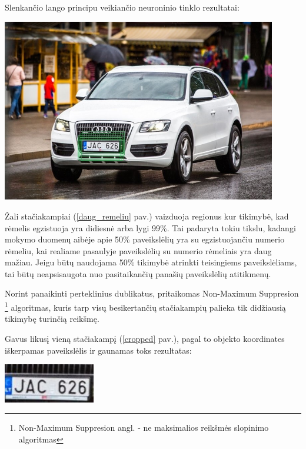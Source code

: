\documentclass{VUMIFInfBakalaurinis}
\begin{document}
Slenkančio lango principu veikiančio neuroninio tinklo rezultatai:

\begin{minipage}{\linewidth}
  \centering
  \includegraphics[width=12cm]{sliding.jpg}
  \label{daug_remeliu}
\end{minipage}

Žali stačiakampiai (\ref{daug_remeliu} pav.) vaizduoja regionus kur tikimybė, kad rėmelis egzistuoja yra didiesnė arba lygi 99\%.
Tai padaryta tokiu tikslu, kadangi mokymo duomenų aibėje apie 50\% paveikslėlių yra su egzistuojančiu numerio rėmeliu,
kai realiame pasaulyje paveikslėlių su numerio rėmeliais yra daug mažiau. Jeigu būtų naudojama 50\% tikimybė atrinkti 
teisingiems paveikslėliams, tai būtų neapsisaugota nuo pasitaikančių panašių paveikslėlių atitikmenų.

Norint panaikinti perteklinius dublikatus, pritaikomas 
Non-Maximum Suppresion \footnote{Non-Maximum Suppresion angl. - ne maksimalios reikšmės slopinimo algoritmas} algoritmas, kuris
tarp visų besikertančių stačiakampių palieka tik didžiausią tikimybę turinčią reikšmę\cite{girshick2014rich}.

Gavus likusį vieną stačiakampį (\ref{cropped} pav.), pagal to objekto koordinates iškerpamas paveikslėlis ir gaunamas toks rezultatas:

\begin{minipage}{\linewidth}
  \centering
  \includegraphics[width=4cm]{cropped_4.jpg}
  \label{cropped}
\end{minipage}
\end{document}
